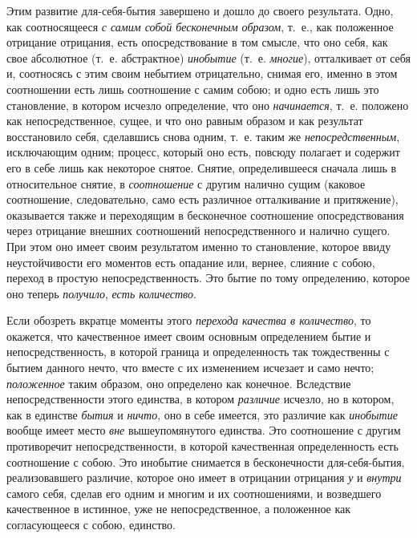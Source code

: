 Этим развитие для-себя-бытия завершено и дошло до своего результата. Одно,
как соотносящееся {\em с самим собой бесконечным
образом}, т.~е., как положенное отрицание отрицания, есть опосредствование
в том смысле, что оно себя, как свое абсолютное (т.~е. абстрактное)
{\em инобытие} (т.~е. {\em многие}), отталкивает от себя и, соотносясь с этим
своим небытием отрицательно, снимая его, именно в этом соотношении есть
лишь соотношение с самим собою; и одно есть лишь это становление, в котором
исчезло определение, что оно {\em начинается}, т.~е.
положено как непосредственное, сущее, и что оно равным образом и как
результат восстановило себя, сделавшись снова одним, т.~е. таким же
{\em непосредственным}, исключающим одним; процесс,
который оно есть, повсюду полагает и содержит его в себе лишь как некоторое
снятое. Снятие, определившееся сначала лишь в относительное снятие, в
{\em соотношение} с другим налично сущим (каковое
соотношение, следовательно, само есть различное отталкивание и
притяжение), оказывается также и переходящим в бесконечное соотношение
опосредствования через отрицание внешних соотношений непосредственного и
налично сущего. При этом оно имеет своим результатом именно то становление,
которое ввиду неустойчивости его моментов есть опадание или, вернее,
слияние с собою, переход в простую непосредственность. Это бытие по тому
определению, которое оно теперь {\em получило}, {\em есть количество}.

Если обозреть вкратце моменты этого {\em перехода
качества в количество}, то окажется, что качественное имеет своим основным
определением бытие и непосредственность, в которой граница и определенность
так тождественны с бытием данного нечто, что вместе с их изменением
исчезает и само нечто; {\em положенное} таким образом,
оно определено как конечное. Вследствие непосредственности этого единства,
в котором {\em различие} исчезло, но в котором, как в
единстве {\em бытия} и {\em ничто},
оно в себе имеется, это различие как {\em инобытие}
вообще имеет место {\em вне} вышеупомянутого единства.
Это соотношение с другим противоречит непосредственности, в которой
качественная определенность есть соотношение с собою. Это инобытие
снимается в бесконечности для-себя-бытия, реализовавшего различие, которое
оно имеет в отрицании отрицания {\em у} и
{\em внутри} самого себя, сделав его одним и многим и
их соотношениями, и возведшего качественное в истинное, уже не
непосредственное, а положенное как согласующееся с собою, единство.

